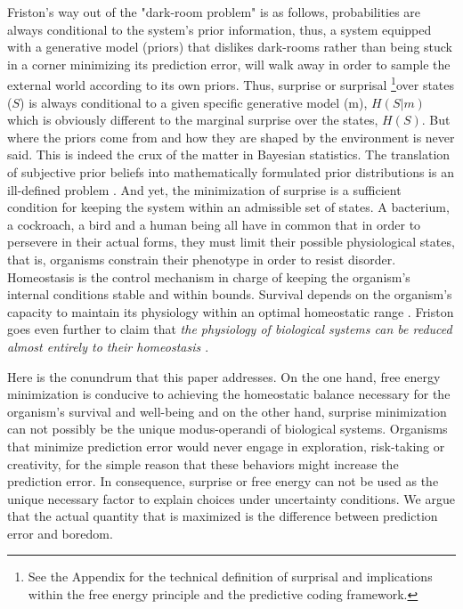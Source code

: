 \documentclass[11pt, onecolumn]{article}
\begin{document}
Friston's way out of the "dark-room problem" is as follows, probabilities are always conditional to the system's prior information, thus, a system equipped with a generative model (priors) that dislikes dark-rooms rather than being stuck in a corner minimizing its prediction error, will walk away in order to sample the external world according to its own priors. Thus, surprise or surprisal  \footnote{See the Appendix for the technical definition of surprisal and implications within the free energy principle and the predictive coding framework.}over states ($S$) is always conditional to a given specific generative model (m), $H(S|m)$ which is obviously different to the marginal surprise over the states, $H(S)$.
But where the priors come from and how they are shaped by the environment is never said. This is indeed the crux of the matter in Bayesian statistics. The translation of subjective prior beliefs into mathematically formulated prior distributions is an ill-defined problem \citep{Gomez-ramirez_limitations_2013}. 
And yet, the minimization of surprise is a sufficient condition for keeping the system within an admissible set of states. 
A bacterium, a cockroach, a bird and a human being all have in common that in order to persevere in their actual forms, they must limit their possible physiological states, that is, organisms constrain their phenotype in order to resist disorder. 
Homeostasis is the control mechanism in charge of keeping the organism's internal conditions stable and within bounds. Survival depends on the organism's capacity to maintain its physiology within an optimal homeostatic range \citep{damasio_nature_2013}. Friston goes even further to claim that \emph{the physiology of biological systems can be reduced almost entirely to their homeostasis \citep{friston_free-energy_2010}}. 

Here is the conundrum that this paper addresses. On the one hand, free energy minimization is conducive to achieving the homeostatic balance necessary for the organism's survival and well-being and on the other hand, surprise minimization can not possibly be the unique modus-operandi of biological systems. Organisms that minimize prediction error would never engage in exploration, risk-taking or creativity, for the simple reason that these behaviors might increase the prediction error. 
In consequence, surprise or free energy can not be used as the unique necessary factor to explain choices under uncertainty conditions. We argue that the actual quantity that is maximized is the difference between prediction error and boredom. 
\end{document}
